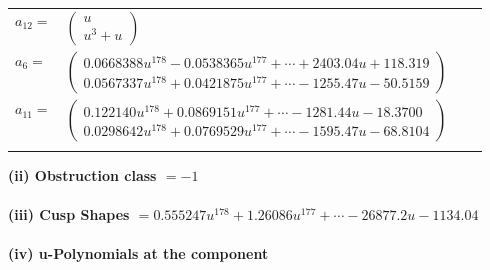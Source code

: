 \documentclass[1p]{elsarticle_modified}
\theoremstyle{definition}
\begin{document}
\begin{tabular}{m{7pt} m{180pt} m{7pt} m{180pt} }
\flushright $a_{12}=$&$\begin{pmatrix}u\\u^3+u\end{pmatrix}$ \\
\flushright $a_{6}=$&$\begin{pmatrix}0.0668388 u^{178}-0.0538365 u^{177}+\cdots+2403.04 u+118.319\\0.0567337 u^{178}+0.0421875 u^{177}+\cdots-1255.47 u-50.5159\end{pmatrix}$ \\
\flushright $a_{11}=$&$\begin{pmatrix}0.122140 u^{178}+0.0869151 u^{177}+\cdots-1281.44 u-18.3700\\0.0298642 u^{178}+0.0769529 u^{177}+\cdots-1595.47 u-68.8104\end{pmatrix}$\\&\end{tabular}
\flushleft \textbf{(ii) Obstruction class $= -1$}\\~\\
\flushleft \textbf{(iii) Cusp Shapes $= 0.555247 u^{178}+1.26086 u^{177}+\cdots-26877.2 u-1134.04$}\\~\\
\newpage\renewcommand{\arraystretch}{1}
\flushleft \textbf{(iv) u-Polynomials at the component}\newline \\
\end{document}
